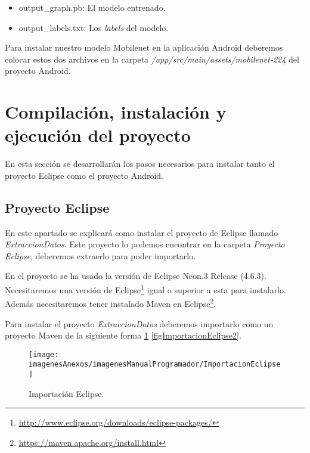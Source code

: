 \begin{itemize}
	\item output\_graph.pb: El modelo entrenado.
	\item output\_labels.txt: Los \textit{labels} del modelo.
\end{itemize}

Para instalar nuestro modelo Mobilenet en la aplicación Android deberemos colocar estos dos archivos en la carpeta \textit{/app/src/main/assets/mobilenet-224} del proyecto Android.

\section{Compilación, instalación y ejecución del proyecto}

En esta sección se desarrollarán los pasos necesarios para instalar tanto el proyecto Eclipse como el proyecto Android.

\subsection{Proyecto Eclipse}

En este apartado se explicará como instalar el proyecto de Eclipse llamado \textit{ExtraccionDatos}. Este proyecto lo podemos encontrar en la carpeta \textit{Proyecto Eclipse}, deberemos extraerlo para poder importarlo.

En el proyecto se ha usado la versión de Eclipse Neon.3 Release (4.6.3). Necesitaremos una versión de Eclipse\footnote{\url{http://www.eclipse.org/downloads/eclipse-packages/}} igual o superior a esta para instalarlo. Además necesitaremos tener instalado Maven en Eclipse\footnote{\url{https://maven.apache.org/install.html}}.

Para instalar el proyecto \textit{ExtraccionDatos} deberemos importarlo como un proyecto Maven de la siguiente forma \ref{figImportacionEclipse} \ref{figImportacionEclipse2}.

\begin{figure}[h]
    \begin{center}%
        \begin{center}%
          \texttt{[image: imagenesAnexos/imagenesManualProgramador/ImportacionEclipse]}%
          \caption{Importación Eclipse.}%
          \label{figImportacionEclipse}%
        \end{center}%
  	\end{center}%
\end{figure}%

